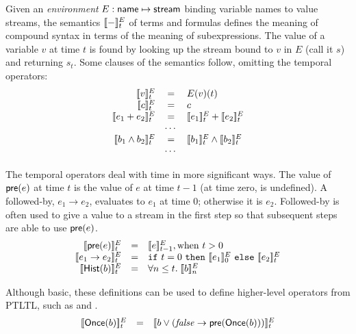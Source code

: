 Given an \emph{environment} $E : \mathsf{name} \mapsto \mathsf{stream}$
binding variable names to value streams, the semantics $[\![ - ]\!]^E_t$
of terms and formulas defines the meaning of compound syntax in terms
of the meaning of subexpressions. The value of a variable $v$ at time
$t$ is found by looking up the stream bound to $v$ in $E$ (call it
$s$) and returning $s_t$. Some clauses of the semantics follow,
omitting the temporal operators:
\[
\begin{array}{rcl}
\sem{v}^E_t & = & E(v)(t) \\
\sem{c}^E_t & = & c \\
\sem{e_1 + e_2}^E_t & = & \sem{e_1}^E_t + \sem{e_2}^E_t \\
   & \cdots & \\
\sem{b_1 \land b_2}^E_t & = & \sem{b_1}^E_t \land \sem{b_2}^E_t \\
   & \cdots & \\
\end{array}
\]

The temporal operators deal with time in more significant ways. The
value of $\mathsf{pre}(e)$ at time $t$ is the value of $e$ at time
$t-1$ (at time zero,  is undefined).  
A followed-by, $e_1 \to e_2$, evaluates to $e_1$ at time 0; otherwise it is $e_2$.
Followed-by is often used to give a value to a stream in the first step so that subsequent steps are able to use $\mathsf{pre}(e)$.
\[
\begin{array}{rcl}
\sem{\konst{pre}(e)}^E_t & = & \sem{e}^E_{t-1}, \mathrm{when}\ t > 0 \\
\sem{e_1 \to e_2}^E_t & = & \itelse{t=0}{\sem{e_1}^E_0}{\sem{e_2}^E_t} \\
\sem{\konst{Hist}(b)}^E_t & = & \forall n \leq t.\; \sem{b}^E_n
\end{array}
\]

Although basic, these definitions can be used to define higher-level
operators from PTLTL, such as  and . 
\[
   \begin{array}{rcl}
      [\![ \mathsf{Once}(b) ]\!]^E_t & = & [\![ b \vee (\mathit{false} \to \mathsf{pre}(\mathsf{Once}(b))) ]\!]^E_t
   \end{array}
\]
